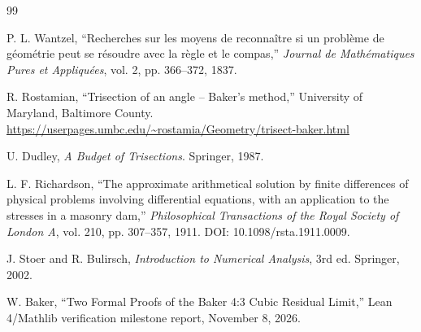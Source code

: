 \documentclass[11pt]{article}
\theoremstyle{remark}
\begin{document}
\begin{thebibliography}{99}

P. L. Wantzel,
``Recherches sur les moyens de reconnaître si un problème de géométrie peut se résoudre avec la règle et le compas,''
\emph{Journal de Mathématiques Pures et Appliquées}, vol. 2, pp. 366--372, 1837.

R. Rostamian,
``Trisection of an angle -- Baker's method,''
University of Maryland, Baltimore County.
\url{https://userpages.umbc.edu/~rostamia/Geometry/trisect-baker.html}

U. Dudley,
\emph{A Budget of Trisections}.
Springer, 1987.

L. F. Richardson,
``The approximate arithmetical solution by finite differences of physical
problems involving differential equations, with an application to the
stresses in a masonry dam,''
\emph{Philosophical Transactions of the Royal Society of London A},
vol. 210, pp. 307--357, 1911. DOI: 10.1098/rsta.1911.0009.

J. Stoer and R. Bulirsch,
\emph{Introduction to Numerical Analysis}, 3rd ed. Springer, 2002.

W. Baker, ``Two Formal Proofs of the Baker 4:3 Cubic Residual Limit,''
Lean 4/Mathlib verification milestone report, November 8, 2026.

\end{thebibliography}
\end{document}
